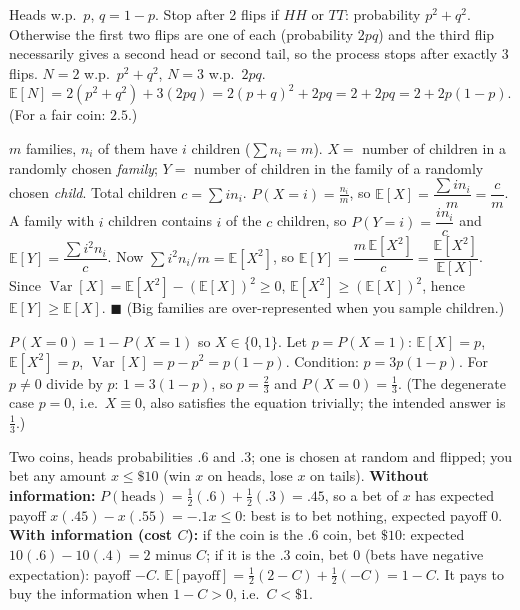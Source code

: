 \documentclass[11pt]{article}
\newcommand{\E}{\mathbb{E}}
\newcommand{\Var}{\operatorname{Var}}
\begin{document}
\begin{exbox}
Heads w.p.\ $p$, $q=1-p$. Stop after 2 flips if $HH$ or $TT$: probability $p^2+q^2$. Otherwise the first two flips are one of each (probability $2pq$) and the third flip necessarily gives a second head or second tail, so the process stops after exactly 3 flips. $N=2$ w.p.\ $p^2+q^2$, $N=3$ w.p.\ $2pq$. $\E[N]=2(p^2+q^2)+3(2pq)=2(p+q)^2+2pq=\boxed{2+2pq}=2+2p(1-p)$. (For a fair coin: $2.5$.)
\end{exbox}

\begin{exbox}
$m$ families, $n_i$ of them have $i$ children ($\sum n_i=m$). $X=$ number of children in a randomly chosen \emph{family}; $Y=$ number of children in the family of a randomly chosen \emph{child}. Total children $c=\sum in_i$. $P(X=i)=\tfrac{n_i}m$, so $\E[X]=\dfrac{\sum in_i}m=\dfrac cm$. A family with $i$ children contains $i$ of the $c$ children, so $P(Y=i)=\dfrac{in_i}c$ and $\E[Y]=\dfrac{\sum i^2n_i}c$. Now $\sum i^2n_i/m=\E[X^2]$, so $\E[Y]=\dfrac{m\,\E[X^2]}c=\dfrac{\E[X^2]}{\E[X]}$. Since $\Var[X]=\E[X^2]-(\E[X])^2\ge0$, $\E[X^2]\ge(\E[X])^2$, hence $\E[Y]\ge\E[X]$. \hfill $\blacksquare$ (Big families are over-represented when you sample children.)
\end{exbox}

\begin{exbox}[{4.5 Find $P(X=0)$ from $\E[X]=3\Var[X]$}]
$P(X=0)=1-P(X=1)$ so $X\in\{0,1\}$. Let $p=P(X=1)$: $\E[X]=p$, $\E[X^2]=p$, $\Var[X]=p-p^2=p(1-p)$. Condition: $p=3p(1-p)$. For $p\ne0$ divide by $p$: $1=3(1-p)$, so $p=\tfrac23$ and $P(X=0)=\boxed{\tfrac13}$. (The degenerate case $p=0$, i.e.\ $X\equiv0$, also satisfies the equation trivially; the intended answer is $\tfrac13$.)
\end{exbox}

\begin{exbox}
Two coins, heads probabilities $.6$ and $.3$; one is chosen at random and flipped; you bet any amount $x\le\$10$ (win $x$ on heads, lose $x$ on tails). \textbf{Without information:} $P(\text{heads})=\tfrac12(.6)+\tfrac12(.3)=.45$, so a bet of $x$ has expected payoff $x(.45)-x(.55)=-.1x\le0$: best is to bet nothing, expected payoff $0$. \textbf{With information (cost $C$):} if the coin is the $.6$ coin, bet $\$10$: expected $10(.6)-10(.4)=2$ minus $C$; if it is the $.3$ coin, bet $0$ (bets have negative expectation): payoff $-C$. $\E[\text{payoff}]=\tfrac12(2-C)+\tfrac12(-C)=\boxed{1-C}$. It pays to buy the information when $1-C>0$, i.e.\ \textbf{$C<\$1$}.
\end{exbox}
\end{document}
